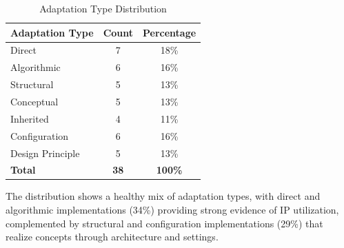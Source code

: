\begin{table}[H]
\centering
\caption{Adaptation Type Distribution}
\label{tab:adaptation-stats}
\begin{tabular}{@{}lcc@{}}
\toprule
\textbf{Adaptation Type} & \textbf{Count} & \textbf{Percentage} \\
\midrule
Direct & 7 & 18\% \\
Algorithmic & 6 & 16\% \\
Structural & 5 & 13\% \\
Conceptual & 5 & 13\% \\
Inherited & 4 & 11\% \\
Configuration & 6 & 16\% \\
Design Principle & 5 & 13\% \\
\midrule
\textbf{Total} & \textbf{38} & \textbf{100\%} \\
\bottomrule
\end{tabular}
\end{table}

The distribution shows a healthy mix of adaptation types, with direct and algorithmic implementations (34\%) providing strong evidence of IP utilization, complemented by structural and configuration implementations (29\%) that realize concepts through architecture and settings.